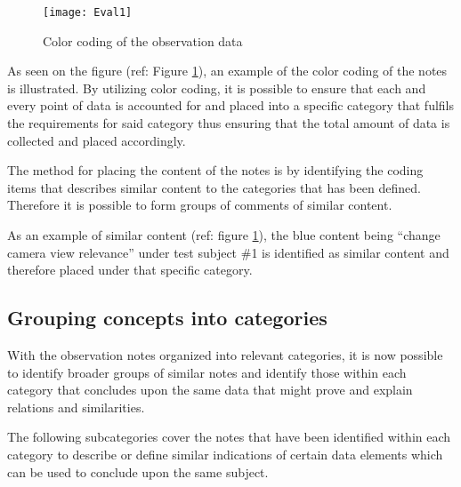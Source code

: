 \begin{figure}[!htbp]
\centering
\texttt{[image: Eval1]}
\caption{Color coding of the observation data} \label{fig:colorcoding}
\end{figure}

As seen on the figure (ref: Figure \ref{fig:colorcoding}), an example of the color coding of the notes is illustrated. 
By utilizing color coding, it is possible to ensure that each and every point of data is accounted for and placed into a specific category that fulfils the requirements for said category thus ensuring that the total amount of data is collected and placed accordingly.
\bigskip

The method for placing the content of the notes is by identifying the coding items that describes similar content to the categories that has been defined. 
Therefore it is possible to form groups of comments of similar content.
\bigskip

As an example of similar content (ref: figure \ref{fig:colorcoding}), the blue content being “change camera view relevance” under test subject \#1 is identified as similar content and therefore placed under that specific category.


\subsection*{Grouping concepts into categories}
 With the observation notes organized into relevant categories, it is now possible to identify broader groups of similar notes and identify those within each category that concludes upon the same data that might prove and explain relations and similarities.
 

The following subcategories cover the notes that have been identified within each category to describe or define similar indications of certain data elements which can be used to conclude upon the same subject.


